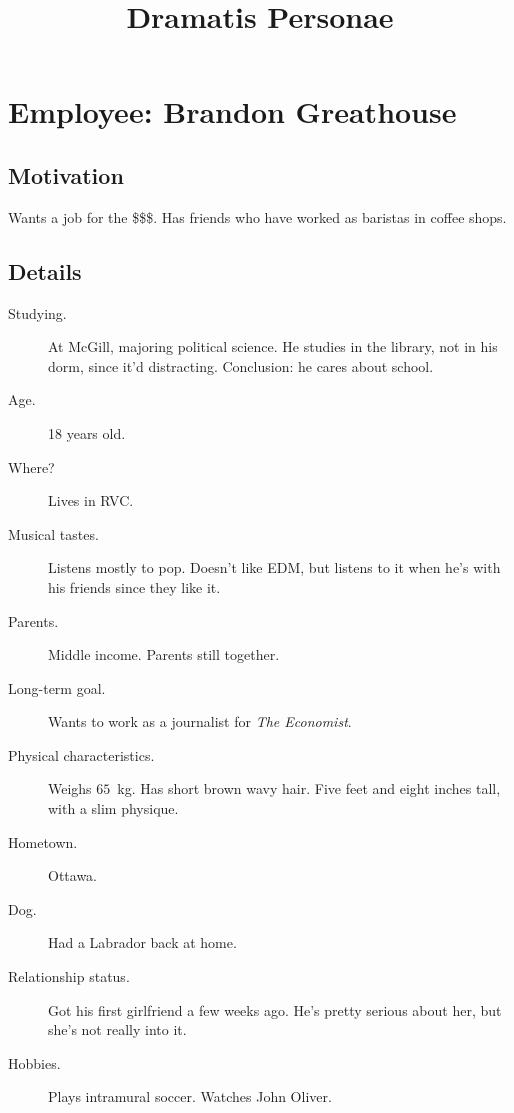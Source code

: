 \documentclass{article}
\title{Dramatis Personae}
\begin{document}
\maketitle

\section*{Employee: Brandon Greathouse}

\subsection{Motivation}

Wants a job for the \$\$\$.
Has friends who have worked as baristas in coffee shops.

\subsection{Details}

\begin{description}
    \item[Studying.]
        At McGill, majoring political science. He studies in the library, not
        in his dorm, since it'd distracting. Conclusion: he cares about school.

    \item[Age.] 18 years old.

    \item[Where?]
        Lives in RVC.

    \item[Musical tastes.]
        Listens mostly to pop. Doesn't like EDM, but listens to it when he's
        with his friends since they like it.

    \item[Parents.]
        Middle income. Parents still together.

    \item[Long-term goal.]
        Wants to work as a journalist for \emph{The Economist}.

    \item[Physical characteristics.]
        Weighs $65$~kg. Has short brown wavy hair. Five feet and eight inches
        tall, with a slim physique.

    \item[Hometown.]
        Ottawa.

    \item[Dog.]
        Had a Labrador back at home.

    \item[Relationship status.]
        Got his first girlfriend a few weeks ago. He's pretty serious about
        her, but she's not really into it.

    \item[Hobbies.]
        Plays intramural soccer. Watches John Oliver.
\end{description}
\end{document}
